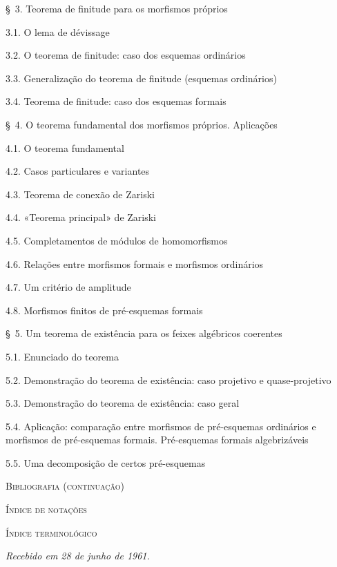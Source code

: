 \begin{flushleft}
\medskip
\S~3. Teorema de finitude para os morfismos próprios 

3.1. O lema de dévissage 

3.2. O teorema de finitude: caso dos esquemas ordinários 

3.3. Generalização do teorema de finitude (esquemas ordinários) 

3.4. Teorema de finitude: caso dos esquemas formais 

\medskip
\S~4. O teorema fundamental dos morfismos próprios. Aplicações 

4.1. O teorema fundamental 

4.2. Casos particulares e variantes 

4.3. Teorema de conexão de Zariski 

4.4. «Teorema principal» de Zariski 

4.5. Completamentos de módulos de homomorfismos 

4.6. Relações entre morfismos formais e morfismos ordinários 

4.7. Um critério de amplitude 

4.8. Morfismos finitos de pré-esquemas formais 


\S~5. Um teorema de existência para os feixes algébricos coerentes 

5.1. Enunciado do teorema 

5.2. Demonstração do teorema de existência: caso projetivo e quase-projetivo

5.3. Demonstração do teorema de existência: caso geral 

5.4. Aplicação: comparação entre morfismos de pré-esquemas ordinários e
morfismos de pré-esquemas formais. Pré-esquemas formais algebrizáveis 

5.5. Uma decomposição de certos pré-esquemas 

\medskip
\textsc{Bibliografia (continuação)} 

\textsc{Índice de notações} 

\textsc{Índice terminológico} 

\begin{flushright}
\emph{Recebido em 28 de junho de 1961.}
\end{flushright}
\end{flushleft}
